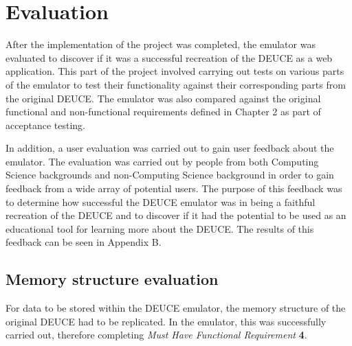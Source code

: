 \documentclass{l4proj}
\begin{document}
\chapter{Evaluation} 
After the implementation of the project was completed, the emulator was evaluated to discover if it was a successful recreation of the DEUCE as a web application. This part of the project involved carrying out tests on various parts of the emulator to test their functionality against their corresponding parts from the original DEUCE. The emulator was also compared against the original functional and non-functional requirements defined in Chapter 2 as part of acceptance testing.

In addition, a user evaluation was carried out to gain user feedback about the emulator. The evaluation was carried out by people from both Computing Science backgrounds and non-Computing Science background in order to gain feedback from a wide array of potential users. The purpose of this feedback was to determine how successful the DEUCE emulator was in being a faithful recreation of the DEUCE and to discover if it had the potential to be used as an educational tool for learning more about the DEUCE. The results of this feedback can be seen in Appendix B.

\section{Memory structure evaluation}
For data to be stored within the DEUCE emulator, the memory structure of the original DEUCE had to be replicated. In the emulator, this was successfully carried out, therefore completing \textit{Must Have Functional Requirement} \textbf{4}.
\end{document}
